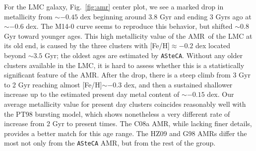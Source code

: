\documentclass[draft]{aa}
\begin{document}
For the LMC galaxy, Fig.~\ref{fig:amr} center plot, we see a marked
drop in metallicity from ${\sim-}0.45$ dex beginning around 3.8 Gyr and
ending 3 Gyrs ago at ${\sim-}0.6$ dex. The M14-0 curve seems to reproduce this
behavior, but shifted ${\sim}0.8$ Gyr toward younger ages.
%
This high metallicity value of the AMR\ of the LMC at its old end, is
caused by the three clusters with [Fe/H]${\approx-0.2}$ dex located beyond
${\sim}3.5$ Gyr; the oldest ages are estimated by \texttt{ASteCA}. Without any older
clusters available in the LMC, it is hard to assess whether this is a
statistically significant feature of the AMR.
%
%
After the drop, there is a steep climb from 3 Gyr to 2 Gyr reaching almost 
[Fe/H]${\sim-}0.3$ dex, and then a sustained shallower increase up
to the estimated present day metal content of ${\sim-}0.15$ dex.
%
Our average metallicity value for present day clusters coincides reasonably
well with the PT98 bursting model, which shows nonetheless a very different
rate of increase from 2 Gyr to present times. The C08a AMR, while lacking finer
details, provides a better match for this age range.
The HZ09 and G98 AMRs differ the most not only from the \texttt{ASteCA}
AMR, but from the rest of the group.
\end{document}

